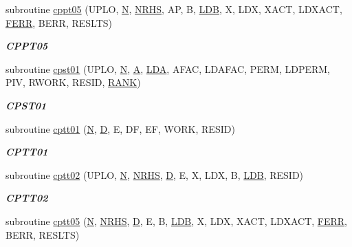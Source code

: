 \begin{DoxyCompactItemize}
subroutine \hyperlink{group__complex__lin_gaa895e164aec69b8bd62e30d27de1a811}{cppt05} (U\+P\+L\+O, \hyperlink{polmisc_8c_a0240ac851181b84ac374872dc5434ee4}{N}, \hyperlink{example__user_8c_aa0138da002ce2a90360df2f521eb3198}{N\+R\+H\+S}, A\+P, B, \hyperlink{example__user_8c_a50e90a7104df172b5a89a06c47fcca04}{L\+D\+B}, X, L\+D\+X, X\+A\+C\+T, L\+D\+X\+A\+C\+T, \hyperlink{superlu__enum__consts_8h_af00a42ecad444bbda75cde1b64bd7e72a78fd14d7abebae04095cfbe02928f153}{F\+E\+R\+R}, B\+E\+R\+R, R\+E\+S\+L\+T\+S)
\begin{DoxyCompactList}\small\item\em {\bfseries C\+P\+P\+T05} \end{DoxyCompactList}\item 
subroutine \hyperlink{group__complex__lin_ga7f22611925b28bcd695faf40cc317298}{cpst01} (U\+P\+L\+O, \hyperlink{polmisc_8c_a0240ac851181b84ac374872dc5434ee4}{N}, \hyperlink{classA}{A}, \hyperlink{example__user_8c_ae946da542ce0db94dced19b2ecefd1aa}{L\+D\+A}, A\+F\+A\+C, L\+D\+A\+F\+A\+C, P\+E\+R\+M, L\+D\+P\+E\+R\+M, P\+I\+V, R\+W\+O\+R\+K, R\+E\+S\+I\+D, \hyperlink{splinemodule_8c_a3a88bcc63386de30443dacede2e01847}{R\+A\+N\+K})
\begin{DoxyCompactList}\small\item\em {\bfseries C\+P\+S\+T01} \end{DoxyCompactList}\item 
subroutine \hyperlink{group__complex__lin_gaebcf52acf0a749939e8b49fb0e854f52}{cptt01} (\hyperlink{polmisc_8c_a0240ac851181b84ac374872dc5434ee4}{N}, \hyperlink{odrpack_8h_a7dae6ea403d00f3687f24a874e67d139}{D}, E, D\+F, E\+F, W\+O\+R\+K, R\+E\+S\+I\+D)
\begin{DoxyCompactList}\small\item\em {\bfseries C\+P\+T\+T01} \end{DoxyCompactList}\item 
subroutine \hyperlink{group__complex__lin_gaea2235767e026ff256f32cd6d940eeaf}{cptt02} (U\+P\+L\+O, \hyperlink{polmisc_8c_a0240ac851181b84ac374872dc5434ee4}{N}, \hyperlink{example__user_8c_aa0138da002ce2a90360df2f521eb3198}{N\+R\+H\+S}, \hyperlink{odrpack_8h_a7dae6ea403d00f3687f24a874e67d139}{D}, E, X, L\+D\+X, B, \hyperlink{example__user_8c_a50e90a7104df172b5a89a06c47fcca04}{L\+D\+B}, R\+E\+S\+I\+D)
\begin{DoxyCompactList}\small\item\em {\bfseries C\+P\+T\+T02} \end{DoxyCompactList}\item 
subroutine \hyperlink{group__complex__lin_gab2ce3b3039202d718ac77c4bc1a9567f}{cptt05} (\hyperlink{polmisc_8c_a0240ac851181b84ac374872dc5434ee4}{N}, \hyperlink{example__user_8c_aa0138da002ce2a90360df2f521eb3198}{N\+R\+H\+S}, \hyperlink{odrpack_8h_a7dae6ea403d00f3687f24a874e67d139}{D}, E, B, \hyperlink{example__user_8c_a50e90a7104df172b5a89a06c47fcca04}{L\+D\+B}, X, L\+D\+X, X\+A\+C\+T, L\+D\+X\+A\+C\+T, \hyperlink{superlu__enum__consts_8h_af00a42ecad444bbda75cde1b64bd7e72a78fd14d7abebae04095cfbe02928f153}{F\+E\+R\+R}, B\+E\+R\+R, R\+E\+S\+L\+T\+S)

\end{DoxyCompactItemize}
